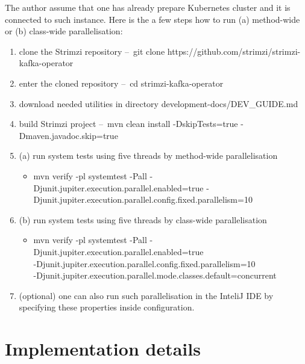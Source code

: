 The author assume that one has already prepare Kubernetes cluster and it is connected to such instance.
Here is the a few steps how to run (a) method-wide or (b) class-wide parallelisation:
\begin{enumerate}[itemsep=1mm, parsep=0pt]
    \item clone the Strimzi repository \---\ git clone https://github.com/strimzi/strimzi-kafka-operator
    \item enter the cloned repository \---\ cd strimzi-kafka-operator
    \item download needed utilities in directory development-docs/DEV\_GUIDE.md
    \item build Strimzi project \---\ mvn clean install -DskipTests=true -Dmaven.javadoc.skip=true
    \item (a) run system tests using five threads by method-wide parallelisation
    \begin{itemize}
        \item  mvn verify -pl systemtest -Pall -Djunit.jupiter.execution.parallel.enabled=true -Djunit.jupiter.execution.parallel.config.fixed.parallelism=10
    \end{itemize}
    \item (b) run system tests using five threads by class-wide parallelisation
    \begin{itemize}
        \item mvn verify -pl systemtest -Pall -Djunit.jupiter.execution.parallel.enabled=true \\
        -Djunit.jupiter.execution.parallel.config.fixed.parallelism=10 \\
        -Djunit.jupiter.execution.parallel.mode.classes.default=concurrent
    \end{itemize}
    \item (optional) one can also run such parallelisation in the InteliJ IDE by specifying these properties inside configuration.
\end{enumerate}

\chapter{Implementation details}
\label{30:appendix:b}

